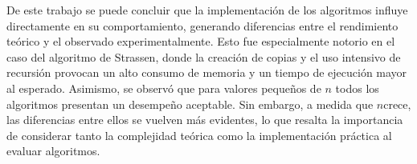 De este trabajo se puede concluir que la implementación de los algoritmos influye directamente en su comportamiento, generando 
diferencias entre el rendimiento teórico y el observado experimentalmente. Esto fue especialmente notorio en el caso del algoritmo 
de Strassen, donde la creación de copias y el uso intensivo de recursión provocan un alto consumo de memoria y un tiempo de ejecución 
mayor al esperado. Asimismo, se observó que para valores pequeños de \(n\) todos los algoritmos presentan un desempeño aceptable. 
Sin embargo, a medida que \(n\)crece, las diferencias entre ellos se vuelven más evidentes, lo que resalta la importancia de considerar 
tanto la complejidad teórica como la implementación práctica al evaluar algoritmos.